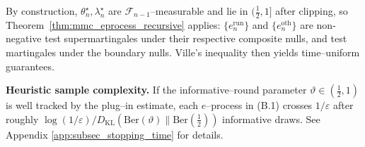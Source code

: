 By construction, $\theta^\star_n,\lambda^\star_n$ are $\mathcal F_{n-1}$–measurable and lie in $(\tfrac12,1]$ after clipping,
so Theorem~\ref{thm:mmc_eprocess_recursive} applies: $\{e^{\mathrm{run}}_n\}$ and $\{e^{\mathrm{oth}}_n\}$ are
non-negative test supermartingales under their respective composite nulls, and test martingales under the boundary nulls.
Ville’s inequality then yields time–uniform guarantees.  

\smallskip
\textbf{Heuristic sample complexity.}
If the informative–round parameter $\vartheta\in(\tfrac12,1)$ is well tracked by the plug–in estimate,
each $e$–process in (B.1) crosses $1/\varepsilon$ after roughly $\log(1/\varepsilon)/D_{\mathrm{KL}}(\mathrm{Ber}(\vartheta)\|\mathrm{Ber}(\tfrac12))$
informative draws. See Appendix \ref{app:subsec_stopping_time} for details. 